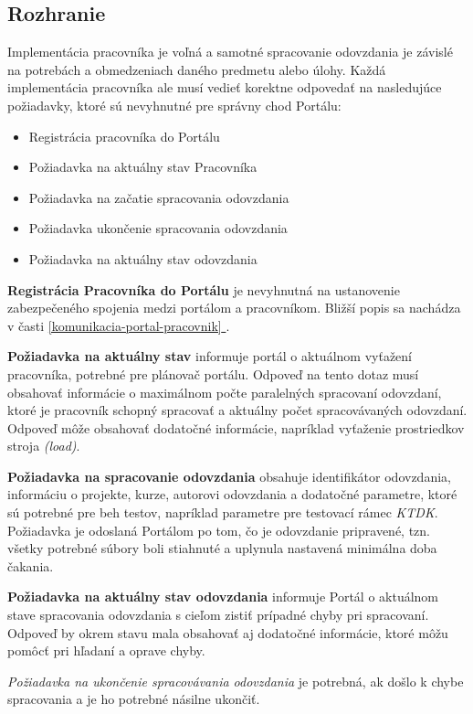 \documentclass[
  digital, %
  twoside, %
  table,   %
  lof,     %
  lot,     %
]{fithesis3}
\newcommand*{\fullref}[1]{\hyperref[{#1}]{\autoref*{#1} \nameref*{#1}}}
\begin{document}
\subsection{Rozhranie}

Implementácia pracovníka je voľná a samotné spracovanie odovzdania je závislé na potrebách a obmedzeniach daného predmetu alebo úlohy. Každá implementácia pracovníka ale musí vedieť korektne odpovedať na nasledujúce požiadavky, ktoré sú nevyhnutné pre správny chod Portálu:

\begin{itemize}
    \item Registrácia pracovníka do Portálu
    \item Požiadavka na aktuálny stav Pracovníka
    \item Požiadavka na začatie spracovania odovzdania
    \item Požiadavka ukončenie spracovania odovzdania
    \item Požiadavka na aktuálny stav odovzdania
\end{itemize}

\textbf{Registrácia Pracovníka do Portálu} je nevyhnutná na ustanovenie zabezpečeného spojenia medzi portálom a pracovníkom. Bližší popis sa nachádza v časti \fullref{komunikacia-portal-pracovnik}.

\textbf{Požiadavka na aktuálny stav} informuje portál o aktuálnom vyťažení pracovníka, potrebné pre plánovač portálu. Odpoveď na tento dotaz musí obsahovať informácie o maximálnom počte paralelných spracovaní odovzdaní, ktoré je pracovník schopný spracovať a aktuálny počet spracovávaných odovzdaní. Odpoveď môže obsahovať dodatočné informácie, napríklad vyťaženie prostriedkov stroja \emph{(load)}.

\textbf{Požiadavka na spracovanie odovzdania} obsahuje identifikátor odovzdania, informáciu o projekte, kurze, autorovi odovzdania a dodatočné parametre, ktoré sú potrebné pre beh testov, napríklad parametre pre testovací rámec \emph{KTDK}. Požiadavka je odoslaná Portálom po tom, čo je odovzdanie pripravené, tzn. všetky potrebné súbory boli stiahnuté a uplynula nastavená minimálna doba čakania.

\textbf{Požiadavka na aktuálny stav odovzdania} informuje Portál o aktuálnom stave spracovania odovzdania s cieľom zistiť prípadné chyby pri spracovaní. Odpoveď by okrem stavu mala obsahovať aj dodatočné informácie, ktoré môžu pomôcť pri hľadaní a oprave chyby.

\emph{Požiadavka na ukončenie spracovávania odovzdania} je potrebná, ak došlo k chybe spracovania a je ho potrebné násilne ukončiť.
\end{document}
